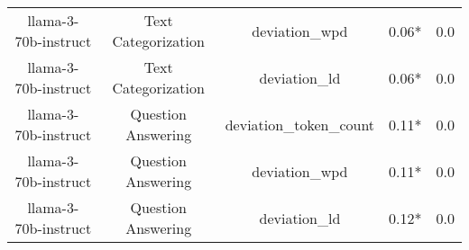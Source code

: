 \begin{table}
\begin{tabular}{ccccc}
llama-3-70b-instruct & Text Categorization & deviation_wpd & 0.06* & 0.0 \\
llama-3-70b-instruct & Text Categorization & deviation_ld & 0.06* & 0.0 \\
llama-3-70b-instruct & Question Answering & deviation_token_count & 0.11* & 0.0 \\
llama-3-70b-instruct & Question Answering & deviation_wpd & 0.11* & 0.0 \\
llama-3-70b-instruct & Question Answering & deviation_ld & 0.12* & 0.0 \\
\bottomrule
\end{tabular}
\end{table}